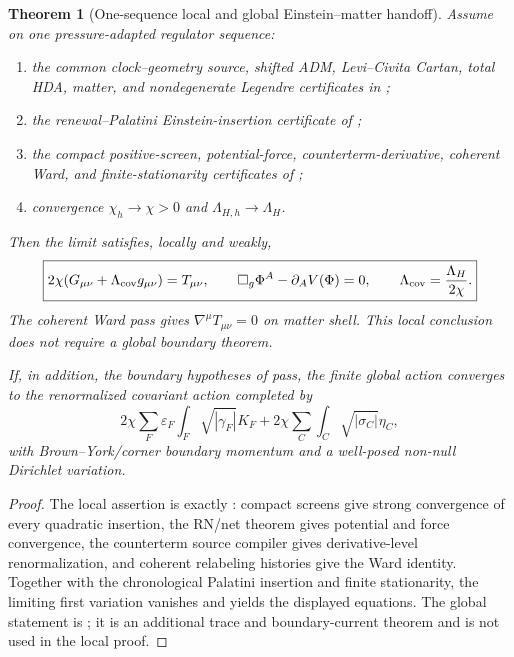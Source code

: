 \documentclass[11pt]{article}
\newtheorem{theorem}{Theorem}[section]
\theoremstyle{definition}
\theoremstyle{remark}
\begin{document}
\begin{theorem}[One-sequence local and global Einstein--matter handoff]
\label{thm:Einstein-extension-master}
Assume on one pressure-adapted regulator sequence:
\begin{enumerate}[label=\textup{(C\arabic*)},leftmargin=3em]
\item the common clock--geometry source, shifted ADM, Levi--Civita Cartan, total
      HDA, matter, and nondegenerate Legendre certificates in
      ;
\item the renewal--Palatini Einstein-insertion certificate of
      ;
\item the compact positive-screen, potential-force, counterterm-derivative,
      coherent Ward, and finite-stationarity certificates of
      ;
\item convergence \(\chi_h\to\chi>0\) and
      \(\Lambda_{H,h}\to\Lambda_H\).
\end{enumerate}
Then the limit satisfies, locally and weakly,
\[
 \boxed{
 2\chi(G_{\mu\nu}+\Lambda_{\rm cov}g_{\mu\nu})=T_{\mu\nu},
 \qquad
 \Box_g\Phi^A-\partial_AV(\Phi)=0,
 \qquad
 \Lambda_{\rm cov}=\frac{\Lambda_H}{2\chi}.}
\]
The coherent Ward pass gives \(\nabla^\mu T_{\mu\nu}=0\) on matter shell.
This local conclusion does not require a global boundary theorem.

If, in addition, the boundary hypotheses of
 pass, the finite global action converges
to the renormalized covariant action completed by
\[
 2\chi\sum_F\varepsilon_F\int_F\sqrt{|\gamma_F|}K_F
 +2\chi\sum_C\int_C\sqrt{|\sigma_C|}\eta_C,
\]
with Brown--York/corner boundary momentum and a well-posed non-null Dirichlet
variation.
\end{theorem}

\begin{proof}
The local assertion is exactly
: compact screens give strong convergence
of every quadratic insertion, the RN/net theorem gives potential and force
convergence, the counterterm source compiler gives derivative-level
renormalization, and coherent relabeling histories give the Ward identity.
Together with the chronological Palatini insertion and finite stationarity,
the limiting first variation vanishes and yields the displayed equations.  The
global statement is ; it is an additional
trace and boundary-current theorem and is not used in the local proof.
\end{proof}
\end{document}
